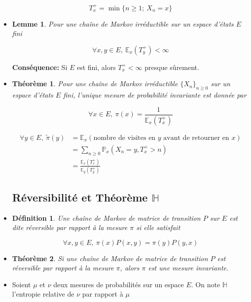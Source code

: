 \documentclass[10pt,a4paper,oneside]{article}
\newtheorem{theoreme}{Théorème}
\newtheorem{lemme}{Lemme}
\newtheorem{definition}{Définition}
\begin{document}
\begin{itemize}
\[ T_x^+ = \min \{ n \geq 1;\ X_n = x \} \]

\item
\begin{lemme}
Pour une chaîne de Markov irréductible sur un espace d'états $E$ fini

\[ \forall x,y \in E,\ \mathbb{E}_x(T_y^+) < \infty \]
\end{lemme}

\textbf{Conséquence:} Si $E$ est fini, alors $T_x^+ < \infty$ presque sûrement.

\item
\begin{theoreme}
Pour une chaîne de Markov irréductible $\{ X_n \}_{n \geq 0}$ sur un espace d'états $E$ fini, l'unique mesure de probabilité invariante est donnée par

\[ \boxed{ \forall x \in E,\ \pi(x) = \frac{1}{\mathbb{E}_x(T_x^+)} } \]
\end{theoreme}

\begin{align*}
\forall y \in E,\ \tilde{\pi}(y) &= \mathbb{E}_x(\text{nombre de visites en } y \text{ avant de retourner en }x)\\
&= \sum_{n \geq 0} \mathbb{P}_x(X_n = y,T_x^+ > n)\\
&= \frac{\mathbb{E}_x(T_x^+)}{\mathbb{E}_y(T_y^+)}
\end{align*}

\subsection{Réversibilité et Théorème $\mathbb{H}$}

\item
\begin{definition}
Une chaîne de Markov de matrice de transition $P$ sur $E$ est dite réversible par rapport à la mesure $\pi$ si elle satisfait

\[ \forall x,y \in E,\ \pi(x) P(x,y) = \pi(y) P(y,x) \]
\end{definition}

\item
\begin{theoreme}
Si une chaîne de Markov de matrice de transition $P$ est réversible par rapport à la mesure $\pi$, alors $\pi$ est une mesure invariante.
\end{theoreme}

\item
Soient $\mu$ et $\nu$ deux mesures de probabilités sur un espace $E$. On note $\mathbb{H}$ l'entropie relative de $\nu$ par rapport à $\mu$


\end{itemize}
\end{document}
